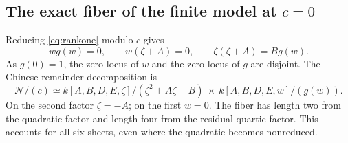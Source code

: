 \documentclass[11pt,a4paper]{article}
\theoremstyle{definition}
\newcommand{\normal}{\mathcal N}
\begin{document}
\subsection{The exact fiber of the finite model at \texorpdfstring{$c=0$}{c=0}}
Reducing \eqref{eq:rankone} modulo $c$ gives
\[
 wg(w)=0,\qquad w(\zeta+A)=0,\qquad
 \zeta(\zeta+A)=Bg(w).
\]
As $g(0)=1$, the zero locus of $w$ and the zero locus of $g$ are disjoint.
The Chinese remainder decomposition is
\begin{equation}\label{eq:CRT}
 \normal/(c)\simeq
 k[A,B,D,E,\zeta]/(\zeta^2+A\zeta-B)
 \ \times\ k[A,B,D,E,w]/(g(w)).
\end{equation}
On the second factor $\zeta=-A$; on the first $w=0$.
The fiber has length two from the quadratic factor and length four from
the residual quartic factor. This accounts for all six sheets, even where
the quadratic becomes nonreduced.
\end{document}
